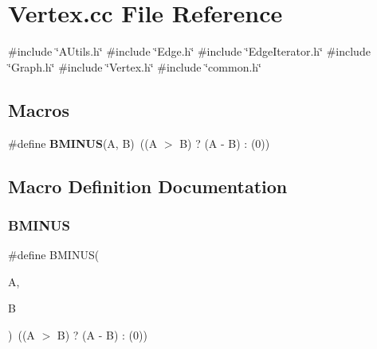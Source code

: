 \section{Vertex.\+cc File Reference}
\label{Vertex_8cc}
{\ttfamily \#include \char`\"{}A\+Utils.\+h\char`\"{}}\newline
{\ttfamily \#include \char`\"{}Edge.\+h\char`\"{}}\newline
{\ttfamily \#include \char`\"{}Edge\+Iterator.\+h\char`\"{}}\newline
{\ttfamily \#include \char`\"{}Graph.\+h\char`\"{}}\newline
{\ttfamily \#include \char`\"{}Vertex.\+h\char`\"{}}\newline
{\ttfamily \#include \char`\"{}common.\+h\char`\"{}}\newline
\subsection*{Macros}
\begin{DoxyCompactItemize}
\item 
\#define \textbf{ B\+M\+I\+N\+US}(A,  B)~((A $>$ B) ? (A -\/ B) \+: (0))
\end{DoxyCompactItemize}


\subsection{Macro Definition Documentation}
\mbox{\label{Vertex_8cc_afea4dab4fa261748c7424bef151d3371}} 
\subsubsection{B\+M\+I\+N\+US}
{\footnotesize\ttfamily \#define B\+M\+I\+N\+US(\begin{DoxyParamCaption}\item[{}]{A,  }\item[{}]{B }\end{DoxyParamCaption})~((A $>$ B) ? (A -\/ B) \+: (0))}

